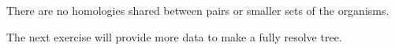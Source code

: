 \documentclass[12pt, hidelinks]{exam}
\newcommand*\AnswerBox[2]{%
    \parbox[t][#1]{0.92\textwidth}{%
    \begin{solution}#2\end{solution}}
    \vspace{\stretch{1}}
}
\begin{document}
\begin{questions}
%		
%



\AnswerBox{3\baselineskip}{There are no homologies shared between pairs or smaller sets of the organisms.}

\end{questions}

 The next exercise will provide more data to make a fully resolve tree.
\end{document}
